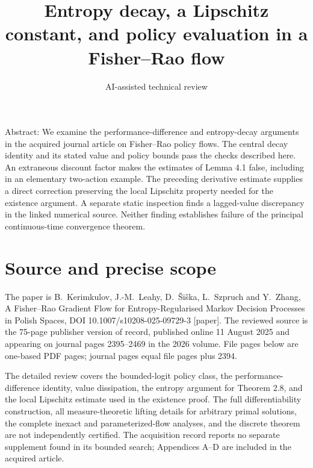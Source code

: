 \documentclass[10pt]{article}
\title{Entropy decay, a Lipschitz constant, and policy evaluation in a Fisher–Rao flow}
\author{AI-assisted technical review}
\date{}
\begin{document}
\maketitle
Abstract: We examine the performance-difference and entropy-decay arguments in the acquired journal article on Fisher–Rao policy flows. The central decay identity and its stated value and policy bounds pass the checks described here. An extraneous discount factor makes the estimates of Lemma 4.1 false, including in an elementary two-action example. The preceding derivative estimate supplies a direct correction preserving the local Lipschitz property needed for the existence argument. A separate static inspection finds a lagged-value discrepancy in the linked numerical source. Neither finding establishes failure of the principal continuous-time convergence theorem.\par
\section*{Source and precise scope}
The paper is B. Kerimkulov, J.-M. Leahy, D. Šiška, L. Szpruch and Y. Zhang, A Fisher–Rao Gradient Flow for Entropy-Regularised Markov Decision Processes in Polish Spaces, DOI 10.1007/s10208-025-09729-3 [paper]. The reviewed source is the 75-page publisher version of record, published online 11 August 2025 and appearing on journal pages 2395–2469 in the 2026 volume. File pages below are one-based PDF pages; journal pages equal file pages plus 2394.\par
The detailed review covers the bounded-logit policy class, the performance-difference identity, value dissipation, the entropy argument for Theorem 2.8, and the local Lipschitz estimate used in the existence proof. The full differentiability construction, all measure-theoretic lifting details for arbitrary primal solutions, the complete inexact and parameterized-flow analyses, and the discrete theorem are not independently certified. The acquisition record reports no separate supplement found in its bounded search; Appendices A–D are included in the acquired article.\par
\end{document}
